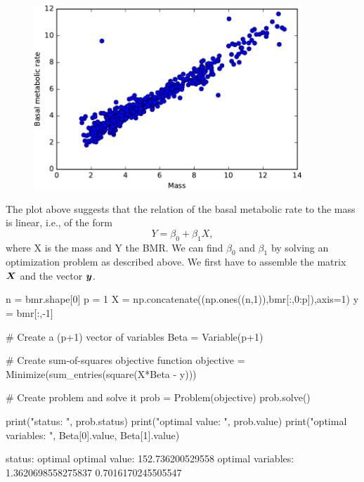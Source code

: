 \begin{example}
\begin{figure}[h!]
\centering
\includegraphics[width=0.9\textwidth]{images/bmr1-crop.pdf}
\end{figure}

The plot above suggests that the relation of the basal metabolic rate to the mass is linear, i.e., of the form
\begin{equation*}
  Y = \beta_0+\beta_1 X,
\end{equation*}
where X is the mass and Y the BMR. We can find $\beta_0$ and $\beta_1$ by solving an optimization problem as described above. We first have to assemble the matrix $\bm{X}$ and the vector $\bm{y}$.

\begin{ipythonnb}[5]
n = bmr.shape[0]
p = 1
X = np.concatenate((np.ones((n,1)),bmr[:,0:p]),axis=1)
y = bmr[:,-1]
\end{ipythonnb}

\begin{ipythonnb}[6]
# Create a (p+1) vector of variables
Beta = Variable(p+1)

# Create sum-of-squares objective function
objective = Minimize(sum_entries(square(X*Beta - y)))

# Create problem and solve it
prob = Problem(objective)
prob.solve()

print("status: ", prob.status)
print("optimal value: ", prob.value)
print("optimal variables: ", Beta[0].value, Beta[1].value)
\end{ipythonnb}
\begin{ipythonnboutno}
status:  optimal
optimal value:  152.736200529558
optimal variables:  1.3620698558275837 0.7016170245505547
\end{ipythonnboutno}


\end{example}
